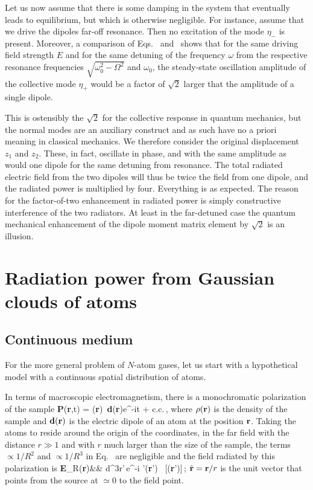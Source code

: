 Let us now assume that there is some damping in the system that eventually leads to equilibrium, but which is otherwise negligible. For instance, assume that we drive the dipoles far-off resonance. Then no excitation of the mode $\eta_-$ is present. Moreover, a comparison of Eqs.~ and~  shows that for the same driving field strength $E$ and for the same detuning of the frequency $\omega$ from the respective resonance frequencies $\sqrt{\omega_0^2-\Omega^2}$ and  $\omega_0$, the steady-state oscillation amplitude of the collective mode $\eta_+$ would be a factor of $\sqrt 2$ larger that the amplitude of a single dipole.

This is ostensibly the $\sqrt 2$ for the collective response in quantum mechanics, but the normal modes are an auxiliary construct and as such have no a priori meaning in classical mechanics. We therefore consider the original displacement $z_1$ and $z_2$. These, in fact, oscillate in phase, and with the same amplitude as would one dipole for the same detuning from resonance. The total radiated electric field from the two dipoles will thus be twice the field from one dipole, and the radiated power is multiplied by four. Everything is as expected. The reason for the factor-of-two enhancement in radiated power is simply constructive interference of the two radiators. At least in the far-detuned case the quantum mechanical enhancement of the dipole moment matrix element by $\sqrt2$ is an illusion.


\section{Radiation power from Gaussian clouds of atoms}


\subsection{Continuous medium}

For the more general problem of $N$-atom gases, let us start with a hypothetical model with a continuous spatial distribution of atoms.

In terms of macroscopic electromagnetism, there is a monochromatic polarization of the sample
\beq
{\bf P}({\bf r},t) = \half\rho({\bf r}) \,{\bf d}({\bf r})e^{-i\omega t} + {\rm c.c.}\,,
\eeq 
where $\rho({\bf r})$ is the density of the sample  and $\bf d({\bf r})$ is the electric dipole of an atom at the position $\bf r$. Taking the atoms  to reside around the origin of the coordinates, in the far field with the distance $r\gg1$ and with $r$ much larger than the size of the sample, the terms  $\propto 1/R^2$ and $\propto 1/R^3$ in Eq.~ are negligible and the  field  radiated by this polarization is
\bea
{\bf E}_R({\bf r})&\simeq& \int d^3r'\,e^{-i  '}\rho({\bf r}')
\, [({\bf r}')]\times{}\,;
\label{SCATFIELD}
\eea
$\hat{\bf r}={\bf r}/r$ is the unit vector that points from the source at $\simeq 0$ to the field point. 

